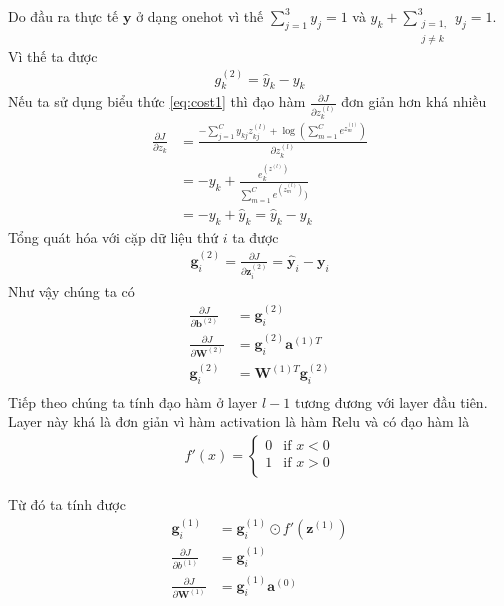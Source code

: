 Do đầu ra thực tế $\textbf{y}$ ở dạng onehot vì thế $\sum^{3}_{j=1}y_j =1$ và $y_k +\sum^{3}_{\substack{j=1,\\j \neq k}} y_j = 1$. Vì thế ta được
\begin{align*}
g^{(2)}_k=\widehat{y}_k - y_k 
\end{align*}
Nếu ta sử dụng biểu thức \ref{eq:cost1} thì đạo hàm $\frac{\partial J}{\partial z^{(l)}_k}$ đơn giản hơn khá nhiều
\begin{equation*}
\begin{split}
\frac{\partial J}{\partial z_k}  
&=\frac{-\sum_{j=1}^C y_{kj} z^{(l)}_{kj} +\log(\sum_{m=1}^C e^{z^{(l)}_{m}})}{\partial z^{(l)}_k}\\
&=-y_{k} + 
\frac{e^{(z^{(l)})}_{k}}{\sum_{m = 1}^C e^{(z^{(l)}_m)})}\\
&= -y_{k} + \widehat{y}_k =  \widehat{y}_k -y_{k}  
\end{split}
\end{equation*} 
Tổng quát hóa với cặp dữ liệu thứ $i$ ta được
\begin{align}
\textbf{g}^{(2)}_i
= \frac{\partial J}{\partial \textbf{z}^{(2)}_i}
= \widehat{\textbf{y}}_i -  \textbf{y}_i
\end{align}
Như vậy chúng ta có 
\begin{align}
\frac{\partial J}{\partial \textbf{b}^{(2)}} 
&= \textbf{g}^{(2)}_i \label{eqn:djdb2} \\ 
\frac{\partial J}{\partial \textbf{W}^{(2)}}
& = \textbf{g}^{(2)}_i \textbf{a}^{(1)T} \label{eqn:djdw2} \\
\textbf{g}^{(2)}_i &= \textbf{W}^{(1)T}\textbf{g}^{(2)}_i \label{eqn:g1}\\
\end{align}
Tiếp theo chúng ta tính đạo hàm ở layer $l-1$ tương đương với layer đầu tiên. Layer này khá là đơn giản vì hàm activation là hàm Relu và có đạo hàm là 
\begin{align*}
f'(x)=
\begin{cases} 
0 & \text{if  }  x < 0 \\
1 & \text{if  }  x > 0 \\
\end{cases}
\end{align*} 

Từ đó ta tính được 
\begin{align*}
\textbf{g}^{(1)}_i 
&= \textbf{g}_{i}^{(1)} \odot f'(\textbf{z}^{(1)})\\
\frac{\partial J}{\partial b^{(1)}} 
&= \textbf{g}^{(1)}_i\\
\frac{\partial J}{\partial \textbf{W}^{(1)}}
&= \textbf{g}^{(1)}_i\textbf{a}^{(0)}
\end{align*}



